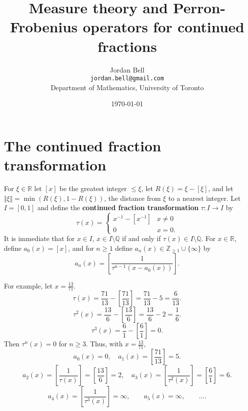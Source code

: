 \documentclass{article}
\newcommand{\norm}[1]{\left\Vert #1 \right\Vert}
\theoremstyle{definition}
\begin{document}
\title{Measure theory and Perron-Frobenius operators for continued fractions}
\author{Jordan Bell\\ \texttt{jordan.bell@gmail.com}\\Department of Mathematics, University of Toronto}
\date{\today}

\maketitle


\section{The continued fraction transformation}
For $\xi \in \mathbb{R}$ let $[x]$ be the greatest integer $\leq \xi$, let $R(\xi)=\xi-[\xi]$, and let $\norm{\xi} = \min(R(\xi),1-R(\xi))$, the distance from $\xi$ to a nearest integer.
Let $I=[0,1]$ and define the \textbf{continued fraction transformation} $\tau:I \to I$ by
\[
\tau(x)=\begin{cases}
x^{-1}-[x^{-1}]&x \neq 0\\
0&x=0.
\end{cases}
\]
It is immediate that for $x \in I$, $x \in I \setminus \mathbb{Q}$ if and only if $\tau(x) \in I \setminus \mathbb{Q}$.
For $x \in \mathbb{R}$,
define $a_0(x) = [x]$, and for $n \geq 1$ define $a_n(x) \in \mathbb{Z}_{\geq 1} \cup \{\infty\}$ by
\[
a_n(x) = \left[ \frac{1}{\tau^{n-1}(x-a_0(x))} \right].
\]

For example, let $x=\frac{13}{71}$.
\[
\tau(x) = \frac{71}{13} - \left[\frac{71}{13} \right] = \frac{71}{13} - 5 = \frac{6}{13}.
\]
\[
\tau^2(x) = \frac{13}{6} - \left[\frac{13}{6}\right] = \frac{13}{6}-2= \frac{1}{6}.
\]
\[
\tau^3(x) = \frac{6}{1}-\left[\frac{6}{1}\right] = 0.
\]
Then $\tau^n(x)=0$ for $n \geq 3$. Thus, with $x=\frac{13}{71}$,
\[
a_0(x)=0,\quad a_1(x) =  \left[\frac{71}{13} \right] = 5.
\]
\[
a_2(x) = \left[\frac{1}{\tau(x)}\right] = \left[\frac{13}{6}\right]=2,\quad
a_3(x) = \left[\frac{1}{\tau^2(x)} \right] = \left[\frac{6}{1}\right]=6.
\]
\[
a_4(x)=\left[\frac{1}{\tau^3(x)}\right] = \infty, \qquad a_5(x) = \infty, \qquad \ldots.
\]
\end{document}
